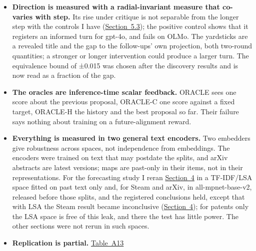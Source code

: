 \documentclass[
  10pt,
]{article}
\begin{document}
\begin{itemize}
  typical paper of their frame. gpt-4o
  and OLMo-7B-0424 predate the
  follow-ups by design; OLMo is smaller
  and runs fewer arms, with one idea per
  context in the discovery sample. The
  2026 generator runs on other contexts,
  and its training cutoff is reported
  only by third parties: if it is later
  than stated, some of its follow-ups
  may be in its training data. The
  one-shot step was tested with three
  wordings of the user prompt, on the
  discovery sample only, and all three
  keep the system prompt that asks for
  ``the next paper''; the genre control
  without the context also ran on the
  discovery sample only.
\item
  \textbf{Direction is measured with a
  radial-invariant measure that
  co-varies with step.} Its rise under
  critique is not separable from the
  longer step with the controls I have
  (\hyperref[sec:5.3]{Section~5.3}); the
  positive control shows that it
  registers an informed turn for gpt-4o,
  and fails on OLMo. The yardsticks are
  a revealed title and the gap to the
  follow-ups' own projection, both
  two-round quantities; a stronger or
  longer intervention could produce a
  larger turn. The equivalence bound of
  ±0.015 was chosen after the discovery
  results and is now read as a fraction
  of the gap.
\item
  \textbf{The oracles are inference-time
  scalar feedback.} ORACLE sees one
  score about the previous proposal,
  ORACLE-C one score against a fixed
  target, ORACLE-H the history and the
  best proposal so far. Their failure
  says nothing about training on a
  future-alignment reward.
\item
  \textbf{Everything is measured in two
  general text encoders.} Two embedders
  give robustness across spaces, not
  independence from embeddings. The
  encoders were trained on text that may
  postdate the splits, and arXiv
  abstracts are latest versions; maps
  are past-only in their items, not in
  their representations. For the
  forecasting study I reran
  \hyperref[sec:4]{Section~4} in a
  TF-IDF/LSA space fitted on past text
  only and, for Steam and arXiv, in
  all-mpnet-base-v2, released before
  those splits, and the registered
  conclusions held, except that with LSA
  the Steam result became inconclusive
  (\hyperref[sec:4]{Section~4}); for
  patents only the LSA space is free of
  this leak, and there the test has
  little power. The other sections were
  not rerun in such spaces.
\item
  \textbf{Replication is partial.}
  \hyperref[tab:A13]{Table~A13}

\end{itemize}
\end{document}
